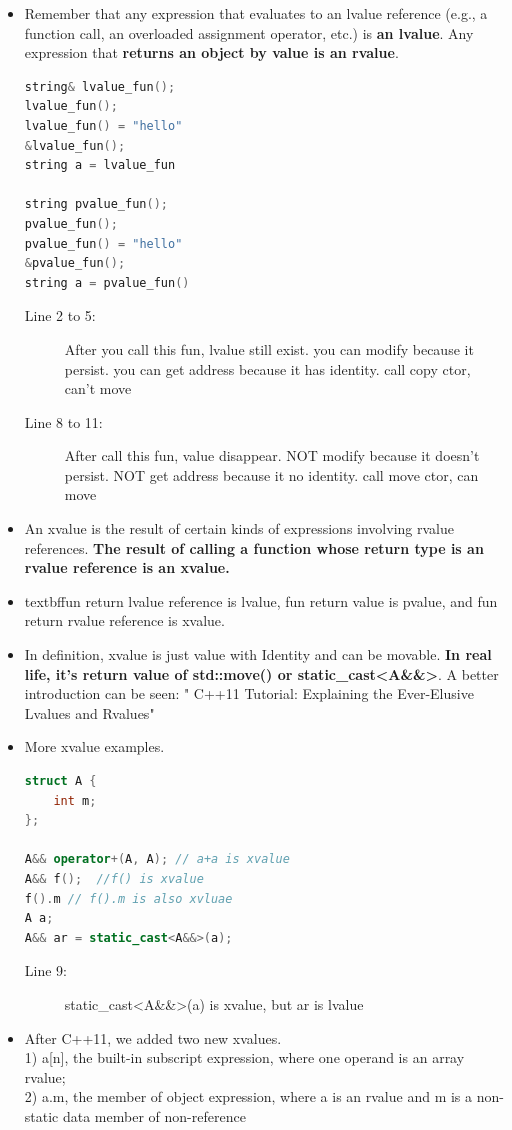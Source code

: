 \documentclass[a4paper,11pt,twoside]{book}
\begin{document}
\begin{itemize}
	\item Remember that any expression that evaluates to an lvalue reference (e.g., a function call, an overloaded assignment operator, etc.) is \textbf{an lvalue}. Any expression that \textbf{returns an object by value is an rvalue}.
	
\begin{lstlisting}[frame=single, language=c++, mathescape=true]
string& lvalue_fun();
lvalue_fun(); 
lvalue_fun() = "hello" 
&lvalue_fun(); 
string a = lvalue_fun 

string pvalue_fun();
pvalue_fun(); 
pvalue_fun() = "hello" 
&pvalue_fun(); 
string a = pvalue_fun() 
\end{lstlisting}
\begin{description}
	\item[Line 2 to 5:] After you call this fun, lvalue still exist. you can modify because it persist. you can get address because it has identity. call copy ctor, can't move
	
	\item[Line 8 to 11:]  After call this fun, value disappear. NOT modify because it doesn't persist. NOT get address because it no identity. call move ctor, can move
\end{description}
	
	\item An xvalue is the result of certain kinds of expressions involving rvalue references. \textbf{The result of calling a function whose return type is an rvalue reference is an xvalue.}
	
	\item textbf{fun return lvalue reference is lvalue, fun return value is pvalue, and fun return rvalue reference is xvalue.}
	
	\item In definition,  xvalue is just value with Identity and can be movable. \textbf{In real life, it's  return value of std::move() or static\_cast<A\&\&>}. A better introduction can be seen: " C++11 Tutorial: Explaining the Ever-Elusive Lvalues and Rvalues"
	
	\item More xvalue examples.
\begin{lstlisting}[frame=single, language=c++, mathescape=true]
struct A {
	int m;
};
	
A&& operator+(A, A); // a+a is xvalue
A&& f();  //f() is xvalue
f().m // f().m is also xvluae
A a;
A&& ar = static_cast<A&&>(a);
\end{lstlisting}
\begin{description}
	\item[Line 9:] static\_cast<A\&\&>(a) is xvalue, but ar is lvalue
\end{description}
	
	\item After C++11, we added two new xvalues.\\
	1) a[n], the built-in subscript expression, where one operand is an array rvalue;\\
	2) a.m, the member of object expression, where a is an rvalue and m is a non-static data member of non-reference
\end{itemize}
\end{document}
